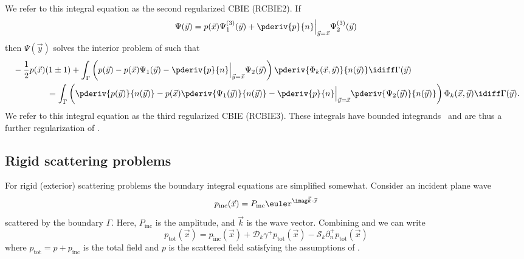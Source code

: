 We refer to this integral equation as the second regularized CBIE (RCBIE2). If
\begin{equation*}
	\Psi(\vec{y}) = p(\vec{x})\Psi_1^{(3)}(\vec{y}) + \pderiv{p}{n}\Big\vert_{\vec{y}=\vec{x}}\Psi_2^{(3)}(\vec{y})
\end{equation*}
then $\Psi(\vec{y})$ solves the interior problem of  such that
\begin{equation}\label{Eq3:RCBIE3}
\begin{aligned}
	&-\frac{1}{2}p(\vec{x})(1\pm 1) + \int_\Gamma \left(p(\vec{y}) - p(\vec{x})\Psi_1(\vec{y}) - \pderiv{p}{n}\Big\vert_{\vec{y}=\vec{x}}\Psi_2(\vec{y})\right)\pderiv{\Phi_k(\vec{x},\vec{y})}{n(\vec{y})}  \idiff\Gamma(\vec{y}) \\
	&{\hskip4em\relax}= \int_\Gamma \left(\pderiv{p(\vec{y})}{n(\vec{y})} - p(\vec{x})\pderiv{\Psi_1(\vec{y})}{n(\vec{y})} - \pderiv{p}{n}\Big\vert_{\vec{y}=\vec{x}}\pderiv{\Psi_2(\vec{y})}{n(\vec{y})}\right)\Phi_k(\vec{x},\vec{y}) \idiff\Gamma(\vec{y}).
\end{aligned}
\end{equation}
We refer to this integral equation as the third regularized CBIE (RCBIE3). These integrals have bounded integrands~\cite{Klaseboer2012nsb} and are thus a further regularization of .

\subsection{Rigid scattering problems}
For rigid (exterior) scattering problems the boundary integral equations are simplified somewhat. Consider an incident plane wave
\begin{equation*}
	p_{\mathrm{inc}}(\vec{x}) = P_{\mathrm{inc}}\euler^{\imag \vec{k}\cdot\vec{x}}
\end{equation*}
scattered by the boundary $\Gamma$. Here, $P_{\mathrm{inc}}$ is the amplitude, and $\vec{k}$ is the wave vector. Combining  and  we can write
\begin{equation*}
	p_{\mathrm{tot}}(\vec{x}) = p_{\mathrm{inc}}(\vec{x}) +\mathcal{D}_k\gamma^+ p_{\mathrm{tot}}(\vec{x}) - \mathcal{S}_k\partial_n^+ p_{\mathrm{tot}}(\vec{x})
\end{equation*}
where $p_{\mathrm{tot}}=p+p_{\mathrm{inc}}$ is the total field and $p$ is the scattered field satisfying the assumptions of . 

